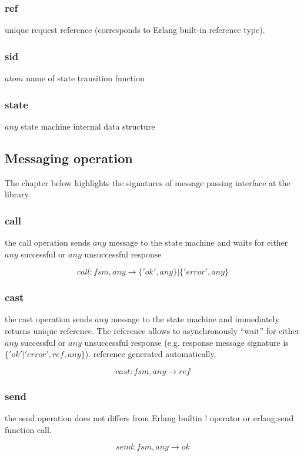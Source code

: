 \documentclass{report}
\begin{document}
\subsubsection{ref}
	unique request reference (corresponds to Erlang built-in reference type).

\subsubsection{sid}
	$atom$ name of state transition function
	
\subsubsection{state}
	$any$ state machine internal data structure


\subsection{Messaging operation}
   The chapter below highlights the signatures  of message passing interface at 
   the library.

\subsubsection{call}
	the call operation sends $any$ message to the state machine and waits for 
	either $any$ successful or $any$ unsuccessful response 

	$$ call: fsm,any \longrightarrow \{'ok', any\} | \{'error', any\} $$


\subsubsection{cast}
	the cast operation sends $any$ message to the state machine and immediately 
	returns unique reference. The reference allows to asynchronously ``wait'' for
	either $any$ successful or $any$ unsuccessful response (e.g. response message 
	signature is $\{'ok' | 'error', ref, any\} $). reference generated automatically. 
	 
   $$ cast: fsm,any \longrightarrow ref$$
  

\subsubsection{send}
	the send operation does not differs from Erlang builtin ! operator or erlang:send
	function call.

	$$ send: fsm,any \longrightarrow ok$$
\end{document}

